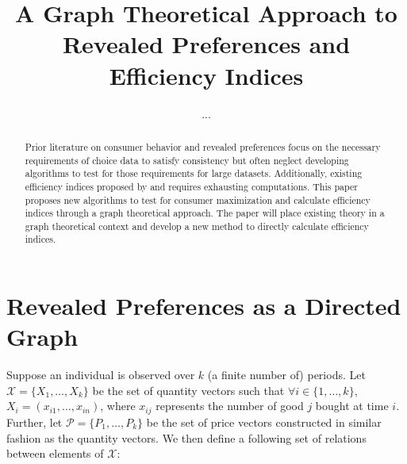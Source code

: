 \documentclass{article} %
\title{A Graph Theoretical Approach to Revealed Preferences and Efficiency Indices}
\author{...}
\begin{document}
\maketitle

\begin{abstract}
Prior literature on consumer behavior and revealed preferences focus on the necessary requirements of choice data to satisfy consistency but often neglect developing algorithms to test for those requirements for large datasets. Additionally, existing efficiency indices proposed by \citet{Afriat1967The-Construction-of-Utility-Functions-from-Expenditure-Data} and \citet{Varian1990Goodness-of-fit-in-optimizing-models} requires exhausting computations. This paper proposes new algorithms to test for consumer maximization and calculate efficiency indices through a graph theoretical approach. The paper will place existing theory in a graph theoretical context and develop a new method to directly calculate efficiency indices.
\end{abstract}

\section*{Revealed Preferences as a Directed Graph}

Suppose an individual is observed over $k$ (a finite number of) periods. Let $\mathcal{X}=\{X_1,\ldots,X_k\}$ be the set of quantity vectors such that $\forall i\in\{1,\ldots,k\}$, $X_i=(x_{i1},\ldots,x_{in})$, where $x_{ij}$ represents the number of good $j$ bought at time $i$. Further, let $\mathcal{P}=\{P_1,\ldots,P_k\}$ be the set of price vectors constructed in similar fashion as the quantity vectors. We then define a following set of relations between elements of $\mathcal{X}$:
\end{document}
